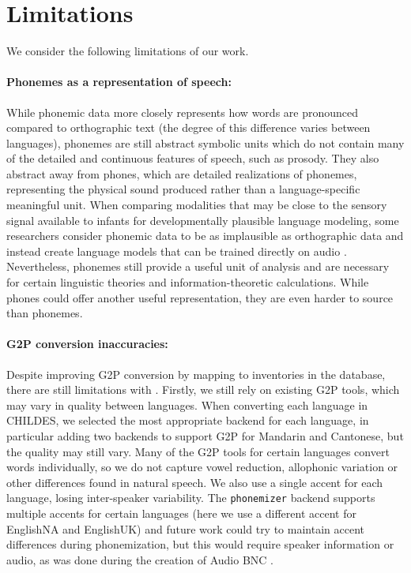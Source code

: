 \section{Limitations}\label{sec:13-limitations}

We consider the following limitations of our work. 

\paragraph{Phonemes as a representation of speech:} While phonemic data more closely represents how words are pronounced compared to orthographic text (the degree of this difference varies between languages), phonemes are still abstract symbolic units which do not contain many of the detailed and continuous features of speech, such as prosody. They also abstract away from phones, which are detailed realizations of phonemes, representing the physical sound produced rather than a language-specific meaningful unit. When comparing modalities that may be close to the sensory signal available to infants for developmentally plausible language modeling, some researchers consider phonemic data to be as implausible as orthographic data \citep{lavechin} and instead create language models that can be trained directly on audio \citep{kamper2017segmental, nguyen2020zero, hsu2021hubert, dunbar2021zero}. Nevertheless, phonemes still provide a useful unit of analysis and are necessary for certain linguistic theories and information-theoretic calculations. While phones could offer another useful representation, they are even harder to source than phonemes.


\paragraph{G2P conversion inaccuracies:} Despite improving G2P conversion by mapping to inventories in the \phoible database, there are still limitations with \corpusphonemizer. Firstly, we still rely on existing G2P tools, which may vary in quality between languages. When converting each language in CHILDES, we selected the most appropriate backend for each language, in particular adding two backends to support G2P for Mandarin and Cantonese, but the quality may still vary. Many of the G2P tools for certain languages convert words individually, so we do not capture vowel reduction, allophonic variation or other differences found in natural speech. We also use a single accent for each language, losing inter-speaker variability. The \texttt{phonemizer} backend supports multiple accents for certain languages (here we use a different accent for EnglishNA and EnglishUK) and future work could try to maintain accent differences during phonemization, but this would require speaker information or audio, as was done during the creation of Audio BNC \citep{coleman2012audio}.

